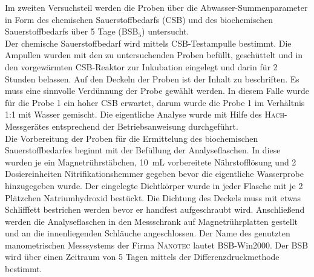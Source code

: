 Im zweiten Versuchsteil werden die Proben über die Abwasser-Summenparameter in Form des chemischen Sauerstoffbedarfs (CSB) und des biochemischen Sauerstoffbedarfs über 5 Tage (BSB$_5$) untersucht.\\
Der chemische Sauerstoffbedarf wird mittels CSB-Testampulle bestimmt. Die Ampullen wurden mit den zu untersuchenden Proben befüllt, geschüttelt und in den vorgewärmten CSB-Reaktor zur Inkubation eingelegt und darin für 2 Stunden belassen. Auf den Deckeln der Proben ist der Inhalt zu beschriften. Es muss eine sinnvolle Verdünnung der Probe gewählt werden. In diesem Falle wurde für die Probe 1 ein hoher CSB erwartet, darum wurde die Probe 1 im Verhältnis 1:1 mit Wasser gemischt. Die eigentliche Analyse wurde mit Hilfe des \textsc{Hach}-Messgerätes entsprechend der Betriebsanweisung durchgeführt.\\
Die Vorbereitung der Proben für die Ermittelung des biochemischen Sauerstoffbedarfes beginnt mit der Befüllung der Analyseflaschen. In diese wurden je ein Magnetrührstäbchen, \SI{10}{\milli\liter} vorbereitete Nährstofflösung und 2 Dosiereinheiten Nitrifikationshemmer gegeben bevor die eigentliche Wasserprobe hinzugegeben wurde. Der eingelegte Dichtkörper wurde in jeder Flasche mit je 2 Plätzchen Natriumhydroxid bestückt. Die Dichtung des Deckels muss mit etwas Schlifffett bestrichen werden bevor er handfest aufgeschraubt wird. Anschließend werden die Analyseflaschen in den Messschrank auf Magnetrührplatten gestellt und an die innenliegenden Schläuche angeschlossen. Der Name des genutzten manometrischen Messsystems der Firma \textsc{Nanotec} lautet BSB-Win2000. Der BSB wird über einen Zeitraum von 5 Tagen mittels der Differenzdruckmethode bestimmt.

